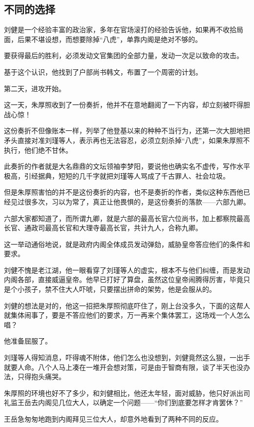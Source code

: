 \begin{multicols}{\theparacolNo}
		\subsection{不同的选择}
		刘健是一个经验丰富的政治家，多年在官场滚打的经验告诉他，如果再不收拾局面，后果不堪设想，而想要除掉“八虎”，单靠内阁是绝对不够的。

		要获得最后的胜利，必须发动文官集团的全部力量，发动一次足以致命的攻击。

		基于这个认识，他找到了户部尚书韩文，布置了一个周密的计划。

		第二天，进攻开始。

		这一天，朱厚照收到了一份奏折，他并不在意地翻阅了一下内容，却立刻被吓得胆战心惊！

		这份奏折不但像账本一样，列举了他登基以来的种种不当行为，还第一次大胆地把矛头直接对准刘瑾等人，表示再也无法容忍，必须立刻杀掉“八虎”，如果朱厚照不执行，他们绝不甘休。

		此奏折的作者就是大名鼎鼎的文坛领袖李梦阳，要说他也确实名不虚传，写作水平极高，引经据典，短短的几千字就把刘瑾等人骂成了千古罪人、社会垃圾。

		但是朱厚照害怕的并不是这份奏折的内容，也不是奏折的作者，类似这种东西他已经见过很多次，习以为常了，真正让他畏惧的，是这份奏折的落款——六部九卿。

		六部大家都知道了，而所谓九卿，就是六部的最高长官六位尚书，加上都察院最高长官、通政司最高长官和大理寺最高长官，共计九人，合称九卿。

		这一举动通俗地说，就是政府内阁全体成员发动弹劾，威胁皇帝答应他们的条件和要求。

		刘健不愧是老江湖，他一眼看穿了刘瑾等人的虚实，根本不与他们纠缠，而是发动内阁各部，直接威逼皇帝。他早已打好了算盘，虽然这位皇帝闹腾得厉害，毕竟只是个小孩子，禁不住大人吓唬，只要摆出拼命的架势，他是会服从的。

		刘健的想法是对的，他这一招把朱厚照彻底吓住了，刚上台没多久，下面的这帮人就集体闹事了，要是不答应他们的要求，万一再来个集体罢工，这场戏一个人怎么唱？

		他准备屈服了。

		刘瑾等人得知消息，吓得魂不附体，他们怎么也没想到，刘健竟然这么狠，一出手就要人命。八个人马上凑在一堆开会想对策，可是由于智商有限，谈了半天也没办法，只得抱头痛哭。

		朱厚照的环境也好不了多少，和刘健相比，他还太年轻，面对威胁，他只好派出司礼监王岳去内阁见几位大人，以确定一个问题——“你们到底要怎样才肯罢休？”

		王岳急匆匆地跑到内阁拜见三位大人，却意外地看到了两种不同的反应。


\end{multicols}
